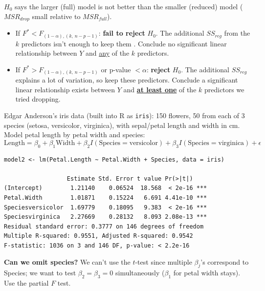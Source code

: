 $H_0$ says the larger (full) model is not better than the smaller (reduced) model
($MSR_{drop}$ small relative to $MSR_{full}$).
\begin{itemize}
    \item If $F^*<F_{(1-\alpha),(k,\,n-p-1)}$: \textbf{fail to reject} $H_0$. The additional
    $SS_{reg}$ from the $k$ predictors isn't enough to keep them . Conclude no significant linear relationship between $Y$ and
    \underline{any} of the $k$ predictors.
    \item If $F^*>F_{(1-\alpha),(k,\,n-p-1)}$ or p-value $<\alpha$: \textbf{reject} $H_0$. The
    additional $SS_{reg}$ explains a lot of variation, so keep these predictors. Conclude a
    significant linear relationship exists between $Y$ and \underline{\textbf{at least one}} of
    the $k$ predictors we tried dropping.
\end{itemize}

\begin{example}
    Edgar Anderson's iris data (built into R as \texttt{iris}): 150 flowers, 50 from each of
    3 species (setosa, versicolor, virginica), with sepal/petal length and width in cm. Model
    petal length by petal width and species:
    \[\text{Length}=\beta_0+\beta_1\text{Width}+\beta_2I(\text{Species}=\text{versicolor})+\beta_3I(\text{Species}=\text{virginica})+\epsilon\]
\begin{verbatim}
model2 <- lm(Petal.Length ~ Petal.Width + Species, data = iris)

                  Estimate Std. Error t value Pr(>|t|)
(Intercept)        1.21140    0.06524  18.568  < 2e-16 ***
Petal.Width        1.01871    0.15224   6.691 4.41e-10 ***
Speciesversicolor  1.69779    0.18095   9.383  < 2e-16 ***
Speciesvirginica   2.27669    0.28132   8.093 2.08e-13 ***
Residual standard error: 0.3777 on 146 degrees of freedom
Multiple R-squared: 0.9551, Adjusted R-squared: 0.9542
F-statistic: 1036 on 3 and 146 DF, p-value: < 2.2e-16
\end{verbatim}
    \textbf{Can we omit species?} We can't use the $t$-test since multiple $\beta_j$'s
    correspond to Species; we want to test $\beta_2=\beta_3=0$ simultaneously ($\beta_1$ for
    petal width stays). Use the partial $F$ test.
\end{example}

